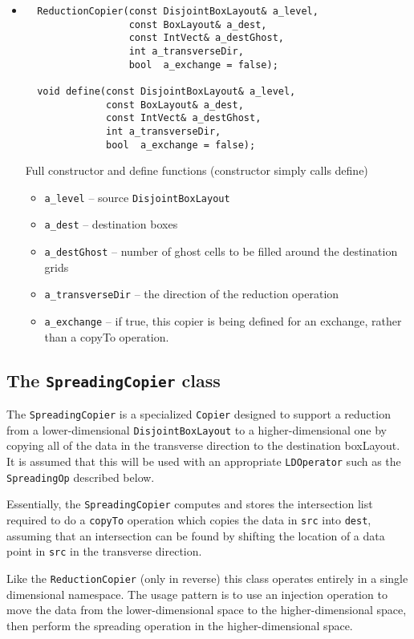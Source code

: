 \begin{itemize}

\item
\begin{verbatim}
  ReductionCopier(const DisjointBoxLayout& a_level,
                  const BoxLayout& a_dest,
                  const IntVect& a_destGhost,
                  int a_transverseDir,
                  bool  a_exchange = false);

  void define(const DisjointBoxLayout& a_level,
              const BoxLayout& a_dest,
              const IntVect& a_destGhost,
              int a_transverseDir,
              bool  a_exchange = false);
\end{verbatim} 
Full constructor and define functions (constructor simply calls define)
\begin{itemize}
\item \verb/a_level/ -- source {\tt DisjointBoxLayout}
\item \verb/a_dest/ -- destination boxes
\item \verb/a_destGhost/ -- number of ghost cells to be filled around the
  destination grids
\item \verb/a_transverseDir/ -- the direction of the reduction
  operation
\item \verb/a_exchange/ -- if true, this copier is being defined for
  an exchange, rather than a copyTo operation.
\end{itemize}


\end{itemize}

\subsection{The {\tt SpreadingCopier} class}
The {\tt SpreadingCopier} is a specialized {\tt Copier} designed to
support a reduction from a lower-dimensional {\tt DisjointBoxLayout}
to a higher-dimensional one by copying all of the data in the
transverse direction to the destination boxLayout.  It is assumed that
this will be used with an appropriate {\tt LDOperator} such as the {\tt SpreadingOp} described below.   

Essentially, the {\tt SpreadingCopier} computes and stores the
intersection list required to do a {\tt copyTo} operation which copies
the data in {\tt src} into {\tt dest}, assuming that an intersection can be  found by shifting the location of a data point in {\tt src} in the transverse  direction.

Like the {\tt ReductionCopier} (only in reverse) this class operates entirely  in a single dimensional namespace.  The usage pattern is to use an injection operation to move the data from the lower-dimensional space to the higher-dimensional space, then perform the spreading operation in the higher-dimensional space.  %

